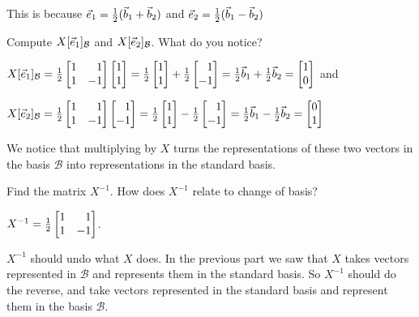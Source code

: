 \documentclass{workbook}
\begin{document}
\begin{slide}
\begin{parts}
\begin{solution}
				This is because ${\vec e_1}=\frac{1}{2}(\vec b_1+\vec b_2)$ and
				${\vec e_2}=\frac{1}{2}(\vec b_1-\vec b_2)$
			\end{solution}
		\item Compute $X[{\vec e_1}]_{\mathcal B}$ and $X[{\vec e_2}]_{\mathcal B}$.
			What do you notice?
			\begin{solution}
				$X[\xhat]_{\mathcal B}=\frac{1}{2}\mat{1&1\\1&-1}\mat{1\\1}
				=\frac{1}{2}\mat{1\\1}+\frac{1}{2}\mat{1\\-1}
				=\frac{1}{2}\vec b_1+\frac{1}{2}\vec b_2=\mat{1\\0}$
				and

				$X[\yhat]_{\mathcal B}=\frac{1}{2}\mat{1&1\\1&-1}\mat{1\\-1}
				=\frac{1}{2}\mat{1\\1}-\frac{1}{2}\mat{1\\-1}
				=\frac{1}{2}\vec b_1-\frac{1}{2}\vec b_2=\mat{0\\1}$

				We notice that multiplying by $X$ turns the representations	of
				these two vectors in the basis $\mathcal B$ into representations
				in the standard basis.
			\end{solution}
		\item Find the matrix $X^{-1}$. How does $X^{-1}$ relate to change of basis?
			\begin{solution}
				$X^{-1}=\tfrac{1}{2}\mat{1&1\\1&-1}$.

				$X^{-1}$ should undo what $X$ does. In the previous part we saw
				that $X$ takes vectors represented in $\mathcal B$ and represents
				them in the standard basis. So $X^{-1}$ should do the reverse, and
				take vectors represented in the standard basis and represent them
				in the basis $\mathcal B$.
			\end{solution}
	\end{parts}

\end{slide}
\end{document}
